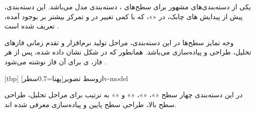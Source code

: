  یکی از دسته‌بندی‌های مشهور برای سطح‌های
، دسته‌بندی مدل  می‌باشد. این دسته‌بندی، پیش از پیدایش
‌های چابک، در  «»، که با کمی
تغییر در   و تمرکز بیشتر بر 
بوجود آمده، تعریف شده است .

وجه تمایز سطح‌ها در این دسته‌بندی، مراحل تولید نرم‌افزار و تقدم زمانی
فازهای تحلیل، طراحی و پیاده‌سازی می‌باشد. همانطور که در شکل
 نشان داده شده، پس از هر فاز، ی برای
 آن فاز نوشته می‌شود .

[tbp]
‌ازوسط
‌تصویر[پهنا=0.7‌سطر]{v-model}

در این دسته‌بندی چهار سطح «»، «»،
«» و «» به ترتیب برای مراحل تحلیل،
طراحی سطح بالا، طراحی سطح پایین و پیاده‌سازی معرفی شده اند.

